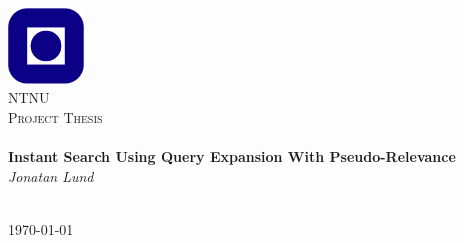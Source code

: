 \begin{titlepage}
\begin{center}
\includegraphics[width=0.15\textwidth]{img/NTNU.png}~\\[1cm]

\textsc{\LARGE NTNU}\\[1.5cm]

\textsc{\Large Project Thesis}\\[0.5cm]

\HRule \\[0.4cm]
{ \huge \bfseries Instant Search Using Query Expansion With Pseudo-Relevance}\\[0.5cm]
{\large \textit{Jonatan Lund}}\\[0.2cm]
\HRule \\[1.5cm]



\vfill

{\large \today}
\end{center}
\end{titlepage}
